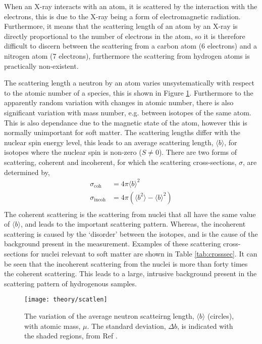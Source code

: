 When an X-ray interacts with an atom, it is scattered by the interaction with the electrons, this is due to the X-ray being a form of electromagnetic radiation. Furthermore, it means that the scattering length of an atom by an X-ray is directly proportional to the number of electrons in the atom, so it is therefore difficult to discern between the scattering from a carbon atom (6 electrons) and a nitrogen atom (7 electrons), furthermore the scattering from hydrogen atoms is practically non-existent.

The scattering length a neutron by an atom varies unsystematically with respect to the atomic number of a species, this is shown in Figure \ref{fig:scatlen}. Furthermore to the apparently random variation with changes in atomic number, there is also significant variation with mass number, e.g. between isotopes of the same atom. This is also dependance due to the magnetic state of the atom, however this is normally unimportant for soft matter. The scattering lengths differ with the nuclear spin energy level, this leads to an average scattering length, $\langle b \rangle$, for isotopes where the nuclear spin is non-zero ($S\neq 0$). There are two forms of scattering, coherent and incoherent, for which the scattering cross-sections, $\sigma$, are determined by,
%
\begin{equation}
	\begin{aligned}
		\sigma_{\text{coh}} & = 4\pi\langle b \rangle ^2 \\
		\sigma_{\text{incoh}} & = 4\pi(\langle b ^ 2 \rangle - \langle b \rangle ^2) \\
	\end{aligned}
\end{equation}
%
The coherent scattering is the scattering from nuclei that all have the same value of $\langle b \rangle$, and leads to the important scattering pattern. Whereas, the incoherent scattering is caused by the `disorder' between the isotopes, and is the cause of the background present in the measurement. Examples of these scattering cross-sections for nuclei relevant to soft matter are shown in Table \ref{tab:crosssec}. It can be seen that the incoherent scattering from the  nuclei is more than forty times the coherent scattering. This leads to a large, intrusive background present in the scattering pattern of hydrogenous samples.
%
\begin{figure}
	\centering
	\texttt{[image: theory/scatlen]}
	\caption{The variation of the average neutron scatteirng length, $\langle b \rangle$ (circles), with atomic mass, $\mu$. The standard deviation, $\Delta b$, is indicated with the shaded regions, from Ref \cite{Sivia2011}.}
	\label{fig:scatlen}
\end{figure}
